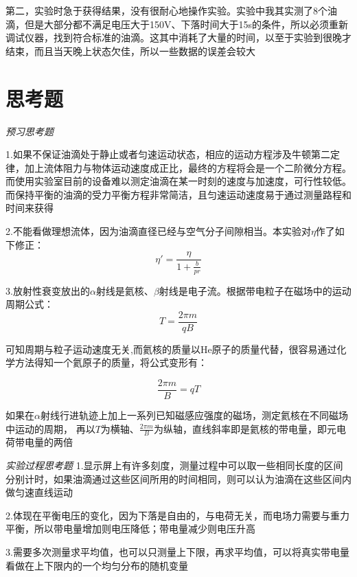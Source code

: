 \documentclass[UTF8]{ctexart}
\begin{document}
    第二，实验时急于获得结果，没有很耐心地操作实验。实验中我其实测了8个油滴，但是大部分都不满足电压大于150V、下落时间大于15s的条件，所以必须重新调试仪器，找到符合标准的油滴。这其中消耗了大量的时间，以至于实验到很晚才结束，而且当天晚上状态欠佳，所以一些数据的误差会较大

    \section{思考题}

    \emph{预习思考题}

    1.如果不保证油滴处于静止或者匀速运动状态，相应的运动方程涉及牛顿第二定律，加上流体阻力与物体运动速度成正比，最终的方程将会是一个二阶微分方程。而使用实验室目前的设备难以测定油滴在某一时刻的速度与加速度，可行性较低。而保持平衡的油滴的受力平衡方程非常简洁，且匀速运动速度易于通过测量路程和时间来获得

    2.不能看做理想流体，因为油滴直径已经与空气分子间隙相当。本实验对$\eta$作了如下修正：
    \begin{equation*}
        \eta'=\frac{\eta}{1+\frac{b}{pr}}
    \end{equation*}
    
    3.放射性衰变放出的$\alpha $射线是氦核、$\beta $射线是电子流。根据带电粒子在磁场中的运动周期公式：
    \begin{equation*}
        T=\frac{2\pi m}{qB}
    \end{equation*}

    可知周期与粒子运动速度无关,而氦核的质量以He原子的质量代替，很容易通过化学方法得知一个氦原子的质量，将公式变形有：

    \begin{equation*}
        \frac{2\pi m}{B}=qT
    \end{equation*}

    如果在$\alpha$射线行进轨迹上加上一系列已知磁感应强度的磁场，测定氦核在不同磁场中运动的周期，
    再以$T$为横轴、$\frac{2\pi m}{B}$为纵轴，直线斜率即是氦核的带电量，即元电荷带电量的两倍

    \emph{实验过程思考题}
    1.显示屏上有许多刻度，测量过程中可以取一些相同长度的区间分别计时，如果油滴通过这些区间所用的时间相同，则可以认为油滴在这些区间内做匀速直线运动

    2.体现在平衡电压的变化，因为下落是自由的，与电荷无关，而电场力需要与重力平衡，所以带电量增加则电压降低；带电量减少则电压升高

    3.需要多次测量求平均值，也可以只测量上下限，再求平均值，可以将真实带电量看做在上下限内的一个均匀分布的随机变量
\end{document}
